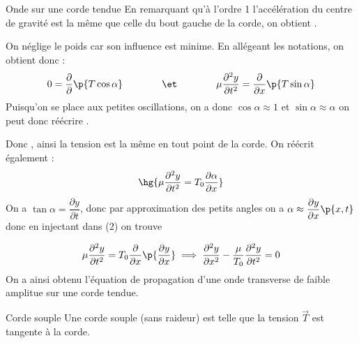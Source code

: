 \begin{example}{Onde sur une corde tendue}{}
        En remarquant qu'à l'ordre 1 l'accélération du centre de gravité est la même que celle du bout gauche de la corde, on obtient \qquad {}.
        
        On néglige le poids car son influence est minime. En allégeant les notations, on obtient donc :
        \[0 = \dfrac{\partial}{\partial}\p{T\cos\alpha} \qquad\qquad\et\qquad\qquad \mu\dfrac{\partial^2 y}{\partial t^2} = \dfrac{\partial}{\partial x}\p{T\sin\alpha} \]
        Puisqu'on se place aux petites oscillations, on a donc $\cos\alpha \approx 1$ et $\sin\alpha \approx \alpha$ on peut donc réécrire .
        
        Donc , ainsi la tension est la même en tout point de la corde. On réécrit également : 
        \[ \hg{\mu\dfrac{\partial^2 y}{\partial t^2} = T_0\dfrac{\partial\alpha}{\partial x}} \]
         On a $\tan\alpha = \dfrac{\partial y}{\partial t}$, donc par approximation des petits angles on a $\alpha\approx\dfrac{\partial y}{\partial x}\p{x,t}$ donc en injectant dans (2) on trouve

        \[\mu\dfrac{\partial^2y}{\partial t^2}=T_0\dfrac{\partial}{\partial x}\p{\dfrac{\partial y}{\partial x}} \implies \dfrac{\partial^2y}{\partial x^2} - \dfrac{\mu}{T_0}\dfrac{\partial^2 y}{\partial t^2} = 0\]
        On a ainsi obtenu l'équation de propagation d'une onde transverse de faible amplitue sur une corde tendue.
    \end{example}

    \begin{definition}{Corde souple}{}
        Une corde souple (sans raideur) est telle que la tension $\vec{T}$ est tangente à la corde.
    \end{definition}

